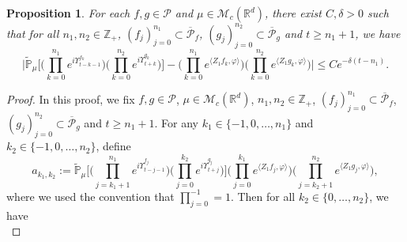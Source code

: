 \documentclass[12pt,a4paper]{amsart}
\theoremstyle{plain}
\newtheorem{prop}[thm]{Proposition}
\theoremstyle{definition}
\numberwithin{equation}{section}
\begin{document}
\begin{prop} \label{cor:MI} 
	For each  $f,g\in \mathcal P$ and $\mu\in \mathcal M_c(\mathbb R^d)$, there exist $C,\delta>0$ such that for
	all $n_1,n_2 \in \mathbb Z_+$, $(f_j)_{j=0}^{n_1}\subset \overline{\mathcal P}_f$, $(g_j)_{j=0}^{n_2}\subset \overline{\mathcal P}_g$ and $t\geq n_1+1$, we have
\begin{equation}
  \label{32corollary}
  \Big|\mathbb{\widetilde{P}}_{\mu}\Big[  \Big(\prod_{k=0}^{n_1}e^{i \Upsilon^{f_k}_{t-k-1}}\Big)  \Big( \prod_{k=0}^{n_2}e^{i \Upsilon^{g_k}_{t+k} } \Big) \Big]  -  \Big(\prod_{k=0}^{n_1} e^{\langle Z_1f_k, \varphi\rangle}\Big) \Big(\prod_{k=0}^{n_2} e^{\langle Z_1g_k, \varphi\rangle}\Big) \Big|\leq C e^{-\delta (t-n_1)}.
\end{equation}
\end{prop}
\begin{proof}
	In this proof, we fix $f,g\in \mathcal P$, $\mu\in \mathcal M_c(\mathbb R^d)$, $n_1,n_2 \in \mathbb Z_+$, $(f_j)_{j=0}^{n_1}\subset \overline{\mathcal P}_f$, $(g_j)_{j=0}^{n_2}\subset \overline{\mathcal P}_g$ and $t\geq n_1 + 1$.
 	For any $k_1 \in \{-1,0,\dots,n_1\}$ and $k_2 \in \{-1,0,\dots,n_2\}$,  define
\[
    a_{k_1,k_2}
    :=  \mathbb{\widetilde{P}}_{\mu}\Big[ \Big(\prod_{j=k_1+1}^{n_1} e^{i\Upsilon_{t-j-1}^{f_j}} \Big)  \Big(\prod_{j=0}^{k_2}e^{i\Upsilon_{t+j}^{g_j}}\Big) \Big] \Big(\prod_{j=0}^{k_1}e^{\langle Z_1 f_j, \varphi\rangle}\Big) \Big(\prod_{j=k_2+1}^{n_2} e^{ \langle Z_1g_j,\varphi \rangle} \Big),
  \]
where we used the convention that
$\prod_{j=0}^{-1} =1.$
  Then for all  $k_2 \in \{0,\dots,n_2\}$, we have
\begin{equation}

\end{equation}
\end{proof}
\end{document}
